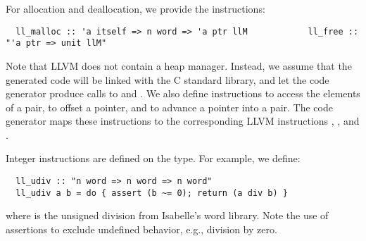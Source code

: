 \documentclass[a4paper,USenglish,cleveref, autoref]{lipics-v2019}
\begin{document}
For allocation and deallocation, we provide the instructions:
\begin{lstlisting}
  ll_malloc :: 'a itself => n word => 'a ptr llM            ll_free :: "'a ptr => unit llM"
\end{lstlisting}
Note that LLVM does not contain a heap manager. 
Instead, we assume that the generated code will be linked with the C standard library, 
and let the code generator produce calls to  and .
%
We also define instructions to access the elements of a pair, to offset a pointer, and to advance a pointer into a pair.
The code generator maps these instructions to the corresponding LLVM instructions , , and .

Integer instructions are defined on the  type. For example, we define:
\begin{lstlisting}
  ll_udiv :: "n word => n word => n word"
  ll_udiv a b = do { assert (b ~= 0); return (a div b) }
\end{lstlisting}
where  is the unsigned division from Isabelle's word library.
Note the use of assertions to exclude undefined behavior, e.g., division by zero.
\end{document}
